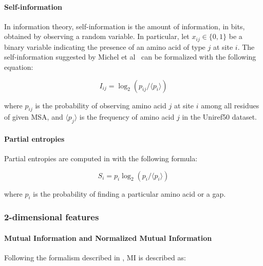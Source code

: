         \paragraph{Self-information}

            In information theory, self-information is the amount of information, in bits,
            obtained by observing a random variable. In particular, let $x_{ij} \in \{0, 1\}$ be
            a binary variable indicating the presence of an amino acid of type $j$ at site $i$.
            The self-information suggested by Michel et al~\cite{Michel383133} can be formalized
            with the following equation:

            \begin{equation}
                I_{ij} = \log_2 (p_{ij} / \langle p_i \rangle)
            \end{equation}

            where $p_{ij}$ is the probability of observing amino acid $j$ at site $i$ among all residues
            of given MSA, and $\langle p_j \rangle$ is the frequency of amino acid $j$
            in the Uniref50 dataset.

        \paragraph{Partial entropies}

            Partial entropies are computed in \cite{Michel383133} with the following formula:

            \begin{equation}
                S_i = p_i \log_2 (p_i / \langle p_i \rangle)
            \end{equation}

            where $p_i$ is the probability of finding a particular amino acid or a gap.

    \subsubsection{2-dimensional features}

        \paragraph{Mutual Information and Normalized Mutual Information}

            Following the formalism described in \cite{Michel383133}, MI is described as:

